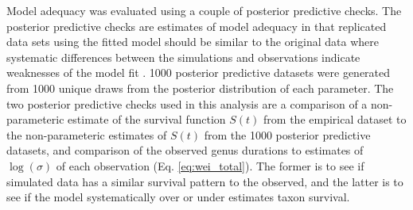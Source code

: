 \documentclass[12pt,letterpaper]{article}
\begin{document}
Model adequacy was evaluated using a couple of posterior predictive checks. The posterior predictive checks are estimates of model adequacy in that replicated data sets using the fitted model should be similar to the original data where systematic differences between the simulations and observations indicate weaknesses of the model fit \citep{Gelman2013d}. 1000 posterior predictive datasets were generated from 1000 unique draws from the posterior distribution of each parameter. The two posterior predictive checks used in this analysis are a comparison of a non-parameteric estimate of the survival function \(S(t)\) from the empirical dataset to the non-parameteric estimates of \(S(t)\) from the 1000 posterior predictive datasets, and comparison of the observed genus durations to estimates of \(\log(\sigma)\) of each observation (Eq. \ref{eq:wei_total}). The former is to see if simulated data has a similar survival pattern to the observed, and the latter is to see if the model systematically over or under estimates taxon survival.
\end{document}
